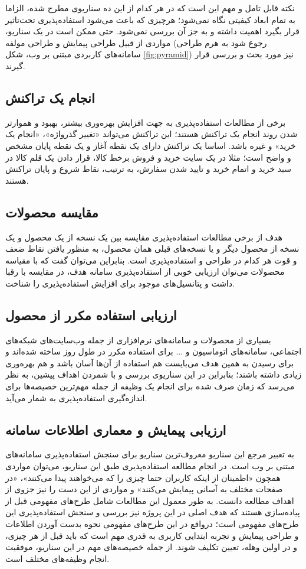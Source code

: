 نکته قابل تامل و مهم این است که در هر کدام از این ده سناریوی مطرح شده، الزاما به تمام ابعاد کیفیتی نگاه نمی‌شود؛ هرچیزی که باعث می‌شود استفاده‌پذیری تحت‌تاثیر قرار بگیرد اهمیت داشته و به جز آن بررسی نمی‌شود. حتی ممکن است در یک سناریو، مواردی از قبیل طراحی پیمایش و طراحی مولفه (رجوع شود به هرم طراحی سامانه‌های کاربردی مبتنی بر وب، شکل \ref{fig:pyramid}) نیز مورد بحث و بررسی قرار گیرند.
\subsection{انجام یک تراکنش}
برخی از مطالعات استفاده‌پذیری به جهت افزایش بهره‌وری بیشتر، بهبود و هموارتر شدن روند انجام یک تراکنش هستند؛ این تراکنش می‌تواند «تغییر گذرواژه»، «انجام یک خرید» و غیره باشد. اساسا یک تراکنش دارای یک نقطه آغاز و یک نقطه پایان مشخص و واضح است؛ مثلا در یک سایت خرید و فروش برخط کالا، قرار دادن یک قلم کالا در سبد خرید و اتمام خرید و تایید شدن سفارش، به ترتیب، نقاط شروع و پایان تراکنش هستند.
\subsection{مقایسه محصولات}
هدف از برخی مطالعات استفاده‌پذیری مقایسه بین یک نسخه از یک محصول و یک نسخه از محصول دیگر و یا نسخه‌های قبلی همان محصول، به منظور یافتن نقاط ضعف و قوت هر کدام در طراحی و استفاده‌پذیری است. بنابراین می‌توان گفت که با مقیاسه محصولات می‌توان ارزیابی خوبی از استفاده‌پذیری سامانه هدف، در مقایسه با رقبا داشت و پتانسیل‌های موجود برای افزایش استفاده‌پذیری را شناخت.
\subsection{ارزیابی استفاده مکرر از محصول}
بسیاری از محصولات و سامانه‌های نرم‌افزاری از جمله وب‌سایت‌های شبکه‌های اجتماعی، سامانه‌های اتوماسیون و ... برای استفاده مکرر در طول روز ساخته شده‌اند و برای رسیدن به همین هدف می‌بایست هم استفاده از آن‌ها آسان باشد و هم بهره‌وری زیادی داشته باشند؛ بنابراین در این سناریوی بررسی و با شمردن اهداف پیشین، به نظر می‌رسد که زمان صرف شده برای انجام یک وظیفه از جمله مهم‌ترین خصیصه‌ها برای اندازه‌گیری استفاده‌پذیری به شمار می‌آید.
\subsection{ارزیابی پیمایش و معماری اطلاعات سامانه}
به تعبیر مرجع
\cite{albert_measuring_2013}
این سناریو معروف‌ترین سناریو برای سنجش استفاده‌پذیری سامانه‌های مبتنی بر وب است. در انجام مطالعه استفاده‌پذیری طبق این سناریو، می‌توان مواردی همچون «اطمینان از اینکه کاربران حتما چیزی را که می‌خواهند پیدا می‌کنند»، «در صفحات مختلف به آسانی پیمایش می‌کنند» و مواردی از این دست را نیز جزوی از اهداف مطالعه دانست. به طور معمول این مطالعات شامل طرح‌های مفهومی قبل از پیاده‌سازی هستند که هدف اصلی در این پروژه نیز بررسی و سنجش استفاده‌پذیری این طرح‌های مفهومی است؛ درواقع در این طرح‌های مفهومی نحوه بدست آوردن اطلاعات و طراحی پیمایش و تجربه ابتدایی کاربری به قدری مهم است که باید قبل از هر چیزی، و در اولین وهله، تعیین تکلیف شوند.
از جمله خصیصه‌های مهم در این سناریو، موفقیت انجام وظیفه‌های مختلف است.
